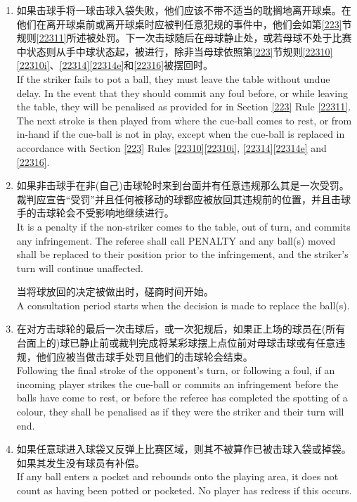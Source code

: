 \begin{enumerate}[label=(\alph*)]
    \item 如果击球手将一球击球入袋失败，他们应该不带不适当的耽搁地离开球桌。在他们在离开球桌前或离开球桌时应被判任意犯规的事件中，他们会如第\ref{223}节规则\ref{22311}所述被处罚。下一次击球随后在母球静止处，或若母球不处于比赛中状态则从手中球状态起，被进行，除非当母球依照第\ref{223}节规则\ref{22310}\ref{22310i}、\ref{22314}\ref{22314e}和\ref{22316}被摆回时。\\
    If the striker fails to pot a ball, they must leave the table without undue delay. In the event that they should commit any foul before, or while leaving the table, they will be penalised as provided for in Section \ref{223} Rule \ref{22311}. The next stroke is then played from where the cue-ball comes to rest, or from in-hand if the cue-ball is not in play, except when the cue-ball is replaced in accordance with Section \ref{223} Rules \ref{22310}\ref{22310i}, \ref{22314}\ref{22314e} and \ref{22316}.
    \item \label{2233k}如果非击球手在非(自己)击球轮时来到台面并有任意违规那么其是一次受罚。裁判应宣告``受罚''并且任何被移动的球都应被放回其违规前的位置，并且击球
    手的击球轮会不受影响地继续进行。\\
    It is a penalty if the non-striker comes to the table, out 
    of turn, and commits any infringement. The referee shall 
    call PENALTY and any ball(s) moved shall be replaced to 
    their position prior to the infringement, and the striker's 
    turn will continue unaffected.

    当将球放回的决定被做出时，磋商时间开始。\\
    A consultation period starts when the decision is made 
    to replace the ball(s).
    \item 在对方击球轮的最后一次击球后，或一次犯规后，如果正上场的球员在(所有台面上的)球已静止前或裁判完成将某彩球摆上点位前对母球击球或有任意违规，他们应被当做击球手处罚且他们的击球轮会结束。\\
    Following the final stroke of the opponent's turn, or following a foul, if an incoming player strikes the cue-ball or commits an infringement before the balls have come to rest, or before the referee has completed the spotting of a colour, they shall be penalised as if they were the striker and their turn will end.
    \item 如果任意球进入球袋又反弹上比赛区域，则其不被算作已被击球入袋或掉袋。如果其发生没有球员有补偿。\\
    If any ball enters a pocket and rebounds onto the playing area, it does not count as having been potted or pocketed. No player has redress if this occurs.
\end{enumerate}


